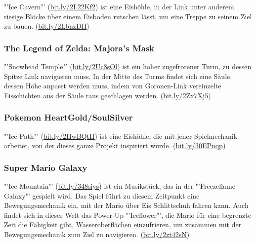 \documentclass[a4paper,10pt,ngerman]{scrartcl}
\begin{document}
				"'Ice Cavern"' (\href{https://youtube.com/watch?v=bcXuwXKsqMY}{bit.ly/2L22Kf2}) ist eine Eishöhle, in der Link unter anderem riesige Blöcke über einem Eisboden rutschen lässt, um eine Treppe zu seinem Ziel zu bauen. (\href{https://youtube.com/watch?v=uaGb3PtSPDg}{bit.ly/2LbnzDH})
			
			
			\subsubsection{The Legend of Zelda: Majora's Mask}
			
				"'Snowhead Temple"' (\href{https://youtube.com/watch?v=uxPDVDpbskI}{bit.ly/2Uc8sOl}) ist ein hoher zugefrorener Turm, zu dessen Spitze Link navigieren muss. In der Mitte des Turms findet sich eine Säule, dessen Höhe anpasst werden muss, indem von Goronen-Link vereinzelte Eisschichten aus der Säule raus geschlagen werden. (\href{https://youtube.com/watch?v=yM8440G32gk}{bit.ly/2Zx7Xj5})
			
			
			\subsubsection{Pokemon HeartGold/SoulSilver}
			
				"'Ice Path"' (\href{https://youtube.com/watch?v=riClBdyycM4}{bit.ly/2HwBQtH}) ist eine Eishöhle, die mit jener Spielmechanik arbeitet, von der dieses ganze Projekt inspiriert wurde. (\href{https://youtube.com/watch?v=erqrS-e-piA}{bit.ly/30EPnqp})
	
	
			\subsubsection{Super Mario Galaxy}
			
			"'Ice Mountain"' (\href{https://youtube.com/watch?v=9qnJWbEnKOs}{bit.ly/348siys}) ist ein Musikstück, das in der "'Freezeflame Galaxy"' gespielt wird. Das Spiel führt zu diesem Zeitpunkt eine Bewegungsmechanik ein, mit der Mario über Eis Schlittschuh fahren kann. Auch findet sich in dieser Welt das Power-Up "'Iceflower"', die Mario für eine begrenzte Zeit die Fähigkeit gibt, Wasseroberflächen einzufrieren, um zusammen mit der Bewegungsmechanik zum Ziel zu navigieren. (\href{https://youtube.com/watch?v=ImsaYCFMJns}{bit.ly/2zt42sN})
		
\end{document}

